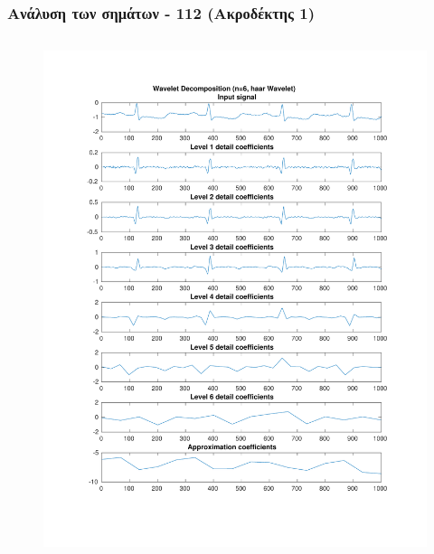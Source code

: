 \documentclass{beamer}
\begin{document}
\begin{frame}
\frametitle{Ανάλυση των σημάτων - 112 (Ακροδέκτης 1)}

\begin{columns}
\begin{figure}
\includegraphics[width=\textwidth]{fig/112l1_dwt1.pdf}
\end{figure}


\end{columns}
\end{frame}
\end{document}

